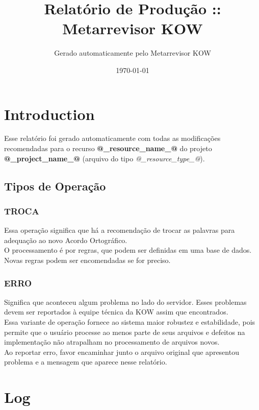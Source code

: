 \documentclass[portuguese,letterpaper]{book}
\begin{document}
\title{Relatório de Produção :: Metarrevisor KOW}
\author{%
Gerado automaticamente pelo Metarrevisor KOW
}
\date{\today}
\maketitle

\tableofcontents{}

\chapter{Introduction}
Esse relatório foi gerado automaticamente com todas as modificações recomendadas para o recurso \textbf{@_resource_name_@} 
do projeto \textbf{@_project_name_@} (arquivo do tipo \emph{@_resource_type_@}).

\section{Tipos de Operação}

\subsection{TROCA}
	Essa operação significa que há a recomendação de trocar as palavras para
	adequação ao novo Acordo Ortográfico.\\

	O processamento é por regras, que podem ser definidas em uma base de
	dados. Novas regras podem ser encomendadas se for preciso.

\subsection{ERRO}
	Significa que aconteceu algum problema no lado do servidor. Esses problemas
	devem ser reportados à equipe técnica da KOW assim que encontrados.\\

	Essa variante de operação fornece ao sistema maior robustez e estabilidade,
	pois permite que o usuário processe ao menos parte de seus arquivos e
	defeitos na implementação não atrapalham no processamento de arquivos
	novos.\\

	Ao reportar erro, favor encaminhar junto o arquivo original que apresentou
	problema e a mensagem que aparece nesse relatório.



\chapter{Log}
\end{document}
